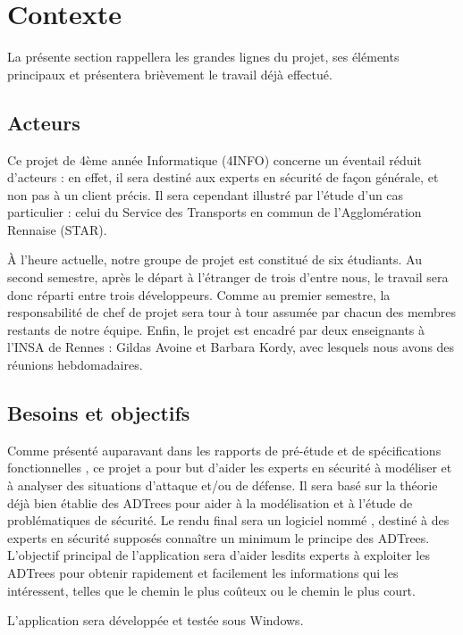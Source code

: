 \section{Contexte}
    \label{sec:contexte}
    La présente section rappellera les grandes lignes du projet, ses éléments principaux et présentera brièvement le travail déjà effectué.

    \subsection{Acteurs}
        Ce projet de 4ème année Informatique (4INFO) concerne un éventail réduit d'acteurs : en effet, il sera destiné aux experts en sécurité de façon générale, et non pas à un client précis. Il sera cependant illustré par l'étude d'un cas particulier : celui du Service des Transports en commun de l'Agglomération Rennaise (STAR).

        À l'heure actuelle, notre groupe de projet est constitué de six étudiants. Au second semestre, après le départ à l’étranger de trois d'entre nous, le travail sera donc réparti entre trois développeurs. Comme au premier semestre, la responsabilité de chef de projet sera tour à tour assumée par chacun des membres restants de notre équipe. Enfin, le projet est encadré par deux enseignants à l'INSA de Rennes : Gildas {\sc Avoine} et Barbara {\sc Kordy}, avec lesquels nous avons des réunions hebdomadaires.

    \subsection{Besoins et objectifs}
        Comme présenté auparavant dans les rapports de pré-étude %
        et de spécifications fonctionnelles %
        , ce projet a pour but d'aider les experts en sécurité à modéliser et à analyser des situations d'attaque et/ou de défense. Il sera basé sur la théorie déjà bien établie des ADTrees pour aider à la modélisation et à l'étude de problématiques de sécurité. Le rendu final sera un logiciel nommé \glasir{}, destiné à des experts en sécurité supposés connaître un minimum le principe des ADTrees. L'objectif principal de l'application sera d'aider lesdits experts à exploiter les ADTrees pour obtenir rapidement et facilement les informations qui les intéressent, telles que le chemin le plus coûteux ou le chemin le plus court.

        L'application sera développée et testée sous Windows.

